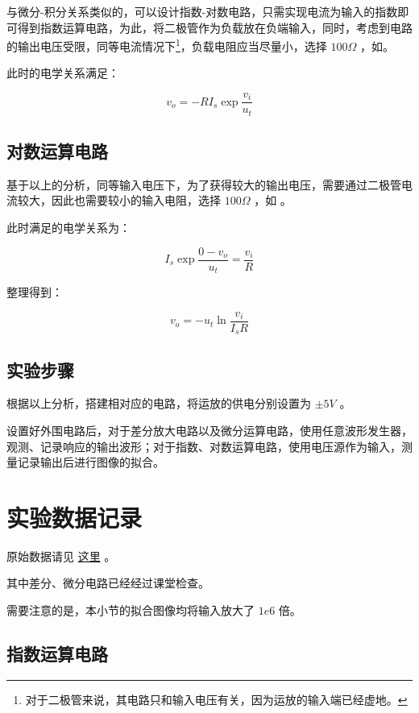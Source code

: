 \documentclass[lang=cn,11pt,a4paper,cite=authoryear]{elegantpaper}
\begin{document}
与微分-积分关系类似的，可以设计指数-对数电路，只需实现电流为输入的指数即可得到指数运算电路，为此，将二极管作为负载放在负端输入，同时，考虑到电路的输出电压受限，同等电流情况下\footnote{对于二极管来说，其电路只和输入电压有关，因为运放的输入端已经虚地。}，负载电阻应当尽量小，选择 \(100 \Omega\) ，如。


此时的电学关系满足：

\[v_o = - R I_s \exp \dfrac{v_i}{u_t} \]

\subsection{对数运算电路}

基于以上的分析，同等输入电压下，为了获得较大的输出电压，需要通过二极管电流较大，因此也需要较小的输入电阻，选择 \(100 \Omega\) ，如 。


此时满足的电学关系为：

\[I_s \exp \dfrac{0 - v_o}{u_t} = \dfrac{v_i}{R} \]

整理得到：

\[v_o = - u_t \ln \dfrac{v_i}{I_s R}\]

\subsection{实验步骤}

根据以上分析，搭建相对应的电路，将运放的供电分别设置为 \(\pm 5 V\) 。

设置好外围电路后，对于差分放大电路以及微分运算电路，使用任意波形发生器，观测、记录响应的输出波形；对于指数、对数运算电路，使用电压源作为输入，测量记录输出后进行图像的拟合。

\section{实验数据记录}

原始数据请见 \href{https://github.com/PannenetsF/Mirco-Electronic-Device-Experiment/tree/main/homework/hw15}{这里} 。

其中差分、微分电路已经经过课堂检查。

需要注意的是，本小节的拟合图像均将输入放大了 \(1e6\) 倍。

\subsection{指数运算电路}
\end{document}
